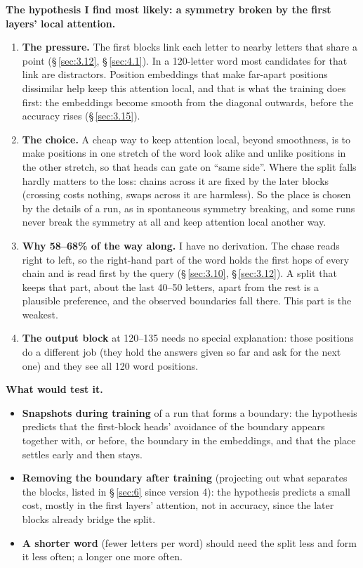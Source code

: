 \documentclass[paper=a4,fontsize=11pt,DIV=11,parskip=half,headings=small,numbers=noendperiod]{scrartcl}
\DeclareRobustCommand{\lead}[1]{\textsf{\bfseries\color{accent}#1}}
\begin{document}
\lead{The hypothesis I find most likely: a symmetry broken by the first layers’ local attention.}

\begin{enumerate}
\item \lead{The pressure.} The first blocks link each letter to nearby letters that share a point
  (\S\,\ref{sec:3.12}, \S\,\ref{sec:4.1}). In a 120-letter word most candidates for that link are distractors.
  Position embeddings that make far-apart positions dissimilar help keep this attention local, and that is what
  the training does first: the embeddings become smooth from the diagonal outwards, before the accuracy rises
  (\S\,\ref{sec:3.15}).
\item \lead{The choice.} A cheap way to keep attention local, beyond smoothness, is to make positions in one
  stretch of the word look alike and unlike positions in the other stretch, so that heads can gate on “same
  side”. Where the split falls hardly matters to the loss: chains across it are fixed by the later blocks
  (crossing costs nothing, swaps across it are harmless). So the place is chosen by the details of a run, as in
  spontaneous symmetry breaking, and some runs never break the symmetry at all and keep attention local another
  way.
\item \lead{Why 58–68\% of the way along.} I have no derivation. The chase reads right to left, so the
  right-hand part of the word holds the first hops of every chain and is read first by the query
  (\S\,\ref{sec:3.10}, \S\,\ref{sec:3.12}). A split that keeps that part, about the last 40–50 letters, apart
  from the rest is a plausible preference, and the observed boundaries fall there. This part is the weakest.
\item \lead{The output block} at 120–135 needs no special explanation: those positions do a different job (they
  hold the answers given so far and ask for the next one) and they see all 120 word positions.
\end{enumerate}

\lead{What would test it.}

\begin{itemize}
\item \lead{Snapshots during training} of a run that forms a boundary: the hypothesis predicts that the
  first-block heads’ avoidance of the boundary appears together with, or before, the boundary in the embeddings,
  and that the place settles early and then stays.
\item \lead{Removing the boundary after training} (projecting out what separates the blocks, listed in
  \S\,\ref{sec:6} since version 4): the hypothesis predicts a small cost, mostly in the first layers’ attention,
  not in accuracy, since the later blocks already bridge the split.
\item \lead{A shorter word} (fewer letters per word) should need the split less and form it less often; a longer
  one more often.
\end{itemize}
\end{document}
